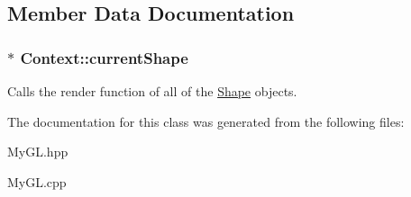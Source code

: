 \subsection{Member Data Documentation}
\subsubsection[{\texorpdfstring{current\+Shape}{currentShape}}]{$\ast$ Context\+::current\+Shape}\hypertarget{classContext_a8c5402128ba3105635ac7d14353d934a}{}\label{classContext_a8c5402128ba3105635ac7d14353d934a}
Calls the render function of all of the \hyperlink{classShape}{Shape} objects. 

The documentation for this class was generated from the following files\+:\begin{DoxyCompactItemize}
\item 
My\+G\+L.\+hpp\item 
My\+G\+L.\+cpp\end{DoxyCompactItemize}
